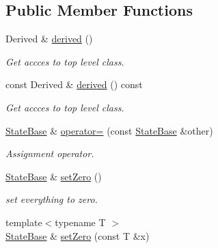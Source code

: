 \subsection*{Public Member Functions}
\begin{DoxyCompactItemize}
\item 
Derived \& \hyperlink{classow__core_1_1StateBase_a39114d2986721cfd3cdb72cc182ba386}{derived} ()\hypertarget{classow__core_1_1StateBase_a39114d2986721cfd3cdb72cc182ba386}{}\label{classow__core_1_1StateBase_a39114d2986721cfd3cdb72cc182ba386}

\begin{DoxyCompactList}\small\item\em Get accces to top level class. \end{DoxyCompactList}\item 
const Derived \& \hyperlink{classow__core_1_1StateBase_a0def37fca391625a5f7136b92d052b11}{derived} () const \hypertarget{classow__core_1_1StateBase_a0def37fca391625a5f7136b92d052b11}{}\label{classow__core_1_1StateBase_a0def37fca391625a5f7136b92d052b11}

\begin{DoxyCompactList}\small\item\em Get accces to top level class. \end{DoxyCompactList}\item 
\hyperlink{classow__core_1_1StateBase}{State\+Base} \& \hyperlink{classow__core_1_1StateBase_a0cba2d2b03a9bd9239c7dbc188d7285d}{operator=} (const \hyperlink{classow__core_1_1StateBase}{State\+Base} \&other)\hypertarget{classow__core_1_1StateBase_a0cba2d2b03a9bd9239c7dbc188d7285d}{}\label{classow__core_1_1StateBase_a0cba2d2b03a9bd9239c7dbc188d7285d}

\begin{DoxyCompactList}\small\item\em Assignment operator. \end{DoxyCompactList}\item 
\hyperlink{classow__core_1_1StateBase}{State\+Base} \& \hyperlink{classow__core_1_1StateBase_aea20417385847280dbf0aced2ab29764}{set\+Zero} ()\hypertarget{classow__core_1_1StateBase_aea20417385847280dbf0aced2ab29764}{}\label{classow__core_1_1StateBase_aea20417385847280dbf0aced2ab29764}

\begin{DoxyCompactList}\small\item\em set everything to zero. \end{DoxyCompactList}\item 
{\footnotesize template$<$typename T $>$ }\\\hyperlink{classow__core_1_1StateBase}{State\+Base} \& \hyperlink{classow__core_1_1StateBase_a7c61b15093e2d99920ecc29e4eaf70b2}{set\+Zero} (const T \&x)\hypertarget{classow__core_1_1StateBase_a7c61b15093e2d99920ecc29e4eaf70b2}{}\label{classow__core_1_1StateBase_a7c61b15093e2d99920ecc29e4eaf70b2}


\end{DoxyCompactItemize}
